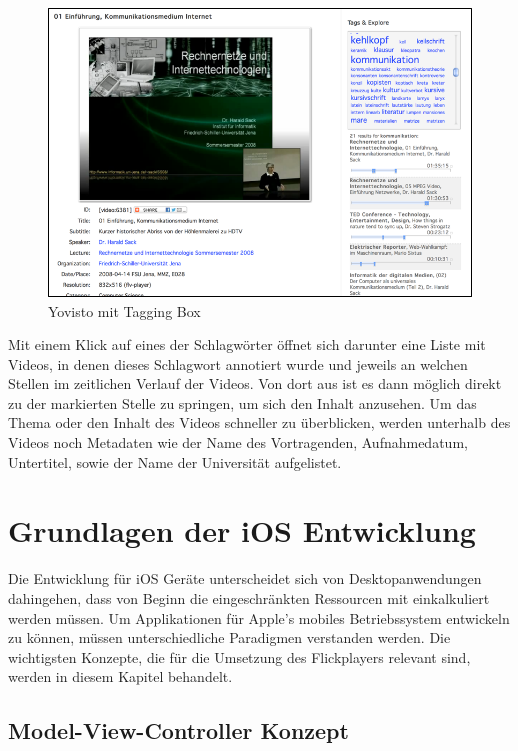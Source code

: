 \documentclass[11pt,a4paper]{report}
\begin{document}
\begin{figure}[h]
\begin{center}
\includegraphics[scale=1.1]{./images/4.png}
\caption{Yovisto mit Tagging Box \cite{YovistoHomepage}}
\label{yovisto}
\end{center}
\end{figure}
Mit einem Klick auf eines der Schlagwörter öffnet sich darunter eine Liste mit Videos, in denen dieses Schlagwort annotiert wurde und jeweils an welchen Stellen im zeitlichen Verlauf der Videos. Von dort aus ist es dann möglich direkt zu der markierten Stelle zu springen, um sich den Inhalt anzusehen. Um das Thema oder den Inhalt des Videos schneller zu überblicken, werden unterhalb des Videos noch Metadaten wie der Name des Vortragenden, Aufnahmedatum, Untertitel, sowie der Name der Universität aufgelistet. \cite{gaiser2008good}

\section{Grundlagen der iOS Entwicklung}

Die Entwicklung für iOS Geräte unterscheidet sich von Desktopanwendungen dahingehen, dass von Beginn die eingeschränkten Ressourcen mit einkalkuliert werden müssen. Um Applikationen für Apple’s mobiles Betriebssystem entwickeln zu können, müssen unterschiedliche Paradigmen verstanden werden. Die wichtigsten Konzepte, die für die Umsetzung des Flickplayers relevant sind, werden in diesem Kapitel behandelt.

\subsection{Model-View-Controller Konzept}
\end{document}
